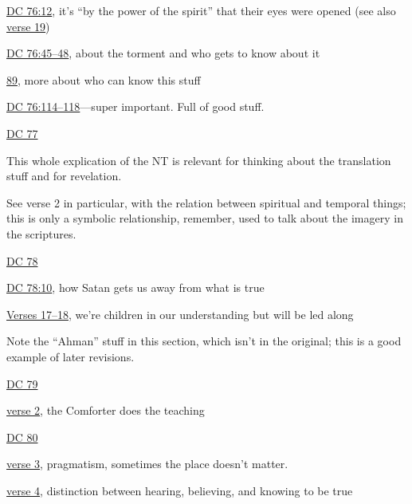 \begin{compactdesc}
\begin{compactitem}
					\item \hyperref[DC76-12]{DC 76:12}, it's ``by the power of the spirit'' that their eyes were opened (see also \hyperref[DC76-19]{verse 19})
					\item \hyperref[DC76-45]{DC 76:45--48}, about the torment and who gets to know about it
					\item \hyperref[DC76-89]{89}, more about who can know this stuff
					\item \hyperref[DC76-114]{DC 76:114--118}---super important. Full of good stuff.
				\end{compactitem}
			\item \hyperref[DC77]{DC 77}
				\begin{compactitem}
					\item This whole explication of the NT is relevant for thinking about the translation stuff and for revelation.
					\item See verse 2 in particular, with the relation between spiritual and temporal things; this is only a symbolic relationship, remember, used to talk about the imagery in the scriptures.
				\end{compactitem}
			\item \hyperref[DC78]{DC 78}
				\begin{compactitem}
					\item \hyperref[DC78-10]{DC 78:10}, how Satan gets us away from what is true
					\item \hyperref[DC78-17]{Verses 17--18}, we're children in our understanding but will be led along
					\item Note the ``Ahman'' stuff in this section, which isn't in the original; this is a good example of later revisions.
				\end{compactitem}
			\item \hyperref[DC79]{DC 79}
				\begin{compactitem}
					\item \hyperref[DC79-2]{verse 2}, the Comforter does the teaching
				\end{compactitem}
			\item \hyperref[DC80]{DC 80}
				\begin{compactitem}
					\item \hyperref[DC80-3]{verse 3}, pragmatism, sometimes the place doesn't matter. 
					\item \hyperref[DC80-4]{verse 4}, distinction between hearing, believing, and knowing to be true
				\end{compactitem}

\end{compactdesc}
